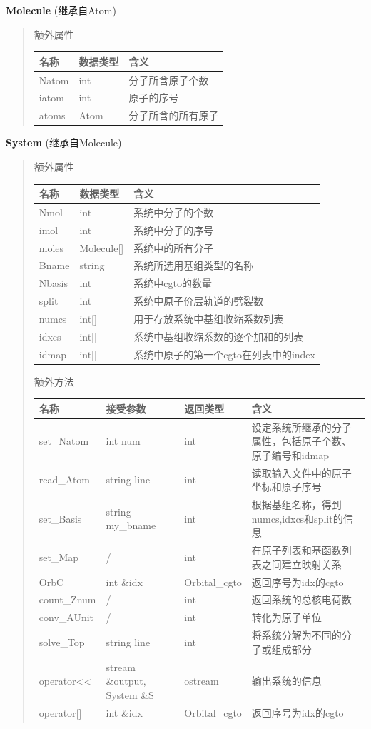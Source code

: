\documentclass[11pt]{article}
\begin{document}
\textbf{Molecule} (继承自Atom)

\begin{quote}
额外属性

\begin{longtable}[]{@{}lll@{}}
\toprule
名称 & 数据类型 & 含义\tabularnewline
\midrule
\endhead
Natom & int & 分子所含原子个数\tabularnewline
iatom & int & 原子的序号\tabularnewline
atoms & Atom & 分子所含的所有原子\tabularnewline
\bottomrule
\end{longtable}
\end{quote}

\textbf{System} (继承自Molecule)

\begin{quote}
额外属性

\begin{longtable}[]{@{}lll@{}}
\toprule
名称 & 数据类型 & 含义\tabularnewline
\midrule
\endhead
Nmol & int & 系统中分子的个数\tabularnewline
imol & int & 系统中分子的序号\tabularnewline
moles & Molecule{[}{]} & 系统中的所有分子\tabularnewline
Bname & string & 系统所选用基组类型的名称\tabularnewline
Nbasis & int & 系统中cgto的数量\tabularnewline
split & int & 系统中原子价层轨道的劈裂数\tabularnewline
numcs & int{[}{]} & 用于存放系统中基组收缩系数列表\tabularnewline
idxcs & int{[}{]} & 系统中基组收缩系数的逐个加和的列表\tabularnewline
idmap & int{[}{]} & 系统中原子的第一个cgto在列表中的index\tabularnewline
\bottomrule
\end{longtable}

额外方法

\begin{longtable}[]{@{}llll@{}}
\toprule
名称 & 接受参数 & 返回类型 & 含义\tabularnewline
\midrule
\endhead
set\_Natom & int num & int &
设定系统所继承的分子属性，包括原子个数、原子编号和idmap\tabularnewline
read\_Atom & string line & int &
读取输入文件中的原子坐标和原子序号\tabularnewline
set\_Basis & string my\_bname & int &
根据基组名称，得到numcs,idxcs和split的信息\tabularnewline
set\_Map & / & int &
在原子列表和基函数列表之间建立映射关系\tabularnewline
OrbC & int \&idx & Orbital\_cgto & 返回序号为idx的cgto\tabularnewline
count\_Znum & / & int & 返回系统的总核电荷数\tabularnewline
conv\_AUnit & / & int & 转化为原子单位\tabularnewline
solve\_Top & string line & int &
将系统分解为不同的分子或组成部分\tabularnewline
operator\textless{}\textless{} & stream \&output, System \&S & ostream &
输出系统的信息\tabularnewline
operator{[}{]} & int \&idx & Orbital\_cgto &
返回序号为idx的cgto\tabularnewline
\bottomrule
\end{longtable}
\end{quote}
\end{document}
